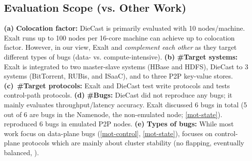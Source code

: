 


\subsection{Evaluation Scope (vs. Other Work)}
\label{eval-other}

%
{\bf (a)} {\bf Colocation factor:} DieCast is primarily evaluated with 10
nodes/machine.  Exalt runs up to 100 nodes per 16-core machine
\sck can achieve up to \maxCF colocation factor.
However, in our view, Exalt and \sck \textit{complement each other} as
they target different types of bugs (data- vs. compute-intensive).
%
{\bf (b)} {\bf \#Target systems:} Exalt is integrated to two master-slave
systems (HBase and HDFS), DieCast to 3 systems (BitTorrent, RUBis, and
ISaaC), and \sck to three P2P key-value stores.
%
{\bf (c)}~{\bf \#Target protocols:} Exalt and DieCast test write protocols and
\sck tests \numProt control-path protocols.
%
{\bf (d)} {\bf \#Bugs:} DieCast did not reproduce any bugs; it mainly
evaluates throughput/latency accuracy.
%
Exalt discussed 6 bugs in total (5 out of 6 are bugs in the Namenode, the
non-emulated node; \sec\ref{mot-state}).
%
\sck reproduced 6 bugs in emulated P2P nodes.
%
{\bf (e)} {\bf Types of bugs:} While most work focus on data-plane bugs
(\sec\ref{mot-control}, \sec\ref{mot-state}), \sck focuses on
control-plane protocols which are mainly about cluster stability (no
flapping, eventually balanced, \etc).

